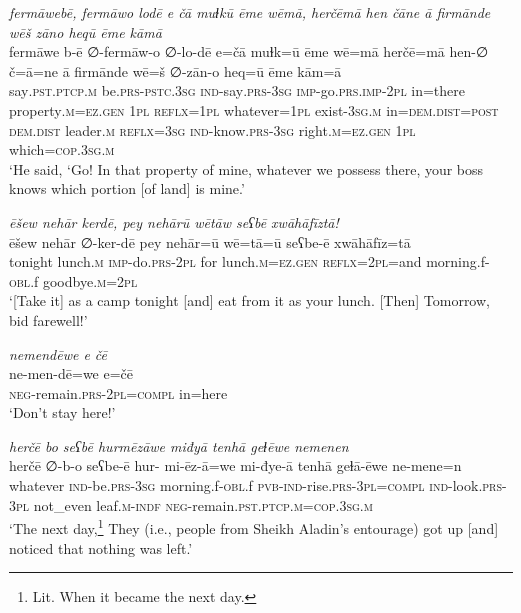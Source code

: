 \ea \label{PM.20}
\textit{fermāwebē, fermāwo lodē e čā muɫkū ēme wēmā, herčēmā hen čāne ā firmānde wēš zāno heqū ēme kāmā} \\ 
\gll fermāwe b-ē ∅-fermāw-o ∅-lo-dē e=čā muɫk=ū ēme wē=mā herčē=mā hen-∅ č=ā=ne ā firmānde wē=š ∅-zān-o heq=ū ēme kām=ā \\ 
 say\textsc{.pst}\textsc{.ptcp}\textsc{.m} be\textsc{.prs}\textsc{-pstc}\textsc{.3sg} \textsc{ind-}say\textsc{.prs}\textsc{-3sg} \textsc{imp-}go\textsc{.prs}.\textsc{imp-}\textsc{2pl} in=there property\textsc{.m}\textsc{\textsc{=ez.gen}} \textsc{1pl} \textsc{reflx}\textsc{=1pl} whatever\textsc{=1pl} exist\textsc{-3sg}\textsc{.m} in=\textsc{dem.dist}\textsc{=\textsc{post}} \textsc{dem.dist} leader\textsc{.m} \textsc{reflx}\textsc{=3sg} \textsc{ind-}know\textsc{.prs}\textsc{-3sg} right\textsc{.m}\textsc{\textsc{=ez.gen}} \textsc{1pl} which\textsc{=cop}\textsc{.3sg}\textsc{.m} \\ 
\glt `He said, ‘Go! In that property of mine, whatever we possess there, your boss knows which portion [of land] is mine.'
\z 
 
\ea \label{PM.21}
\textit{ēšew nehār kerdē, pey nehārū wētāw seʕbē xwāhāfīztā!} \\ 
\gll ēšew nehār ∅-ker-dē pey nehār=ū wē=tā=ū seʕbe-ē xwāhāfīz=tā \\ 
 tonight lunch\textsc{.m} \textsc{imp-}do\textsc{.prs}-\textsc{2pl} for lunch\textsc{.m}\textsc{\textsc{=ez.gen}} \textsc{reflx}=\textsc{2pl}=and morning.f\textsc{-obl}.f goodbye\textsc{.m}=\textsc{2pl} \\ 
\glt `[Take it] as a camp tonight [and] eat from it as your lunch. [Then] Tomorrow, bid farewell!'
\z 
 
\ea \label{PM.22}
\textit{nemendēwe e čē} \\ 
\gll ne-men-dē=we e=čē \\ 
 \textsc{neg-}remain\textsc{.prs}-\textsc{2pl}\textsc{=compl} in=here \\ 
\glt `Don’t stay here!'
\z 
 
\ea \label{PM.24}
\textit{herčē bo seʕbē hurmēzāwe miđyā tenhā geɫēwe nemenen} \\ 
\gll herčē ∅-b-o seʕbe-ē hur- mi-ēz-ā=we mi-đye-ā tenhā geɫā-ēwe ne-mene=n \\ 
 whatever \textsc{ind-}be\textsc{.prs}\textsc{-3sg} morning.f\textsc{-obl}.f \textsc{pvb-}\textsc{ind-}rise\textsc{.prs}\textsc{-3pl}\textsc{=compl} \textsc{ind-}look\textsc{.prs}\textsc{-3pl} not\_even leaf\textsc{.m}\textsc{-indf} \textsc{neg-}remain\textsc{.pst}\textsc{.ptcp}\textsc{.m}\textsc{=cop}\textsc{.3sg}\textsc{.m} \\ 
\glt `The next day,\footnote{Lit. When it became the next day.} They (i.e., people from Sheikh Aladin’s entourage) got up [and] noticed that nothing was left.'
\z 
 
